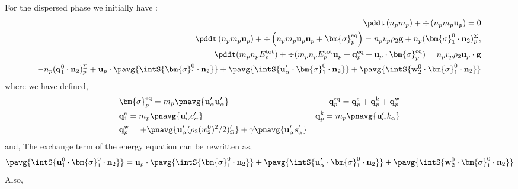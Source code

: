 For the dispersed phase we initially have :
\begin{align*}
    \pddt \left(n_p m_p\right)
    + \div \left(n_pm_p\textbf{u}_p
    \right)
    = 
    0\\
    \pddt \left(n_p m_p \textbf{u}_p\right)
    + \div \left(n_p
    m_p \textbf{u}_p \textbf{u}_p 
    + \bm{\sigma}_p^\text{eq}
    \right)
    = 
    n_p v_p \rho_2 \textbf{g}
    + n_p (\bm{\sigma}_1^0 \cdot \textbf{n}_2)_p^\Sigma,\\
    \pddt(m_p n_pE_p^\text{tot})
    + \div(m_pn_p E_p^\text{tot} \textbf{u}_p 
    + \textbf{q}_p^\text{eq} 
    + \textbf{u}_p \cdot \bm{\sigma}_p^\text{eq})
    =  n_p v_p \rho_2 \textbf{u}_p\cdot  \textbf{g}\\
    -  n_p (\textbf{q}_1^0 \cdot \textbf{n}_2)_p^\Sigma
    + \textbf{u}_p \cdot\pavg{\intS{\bm{\sigma}_1^0 \cdot \textbf{n}_2}}
    + \pavg{\intS{\textbf{u}_\alpha' \cdot\bm{\sigma}_1^0 \cdot \textbf{n}_2}}
    + \pavg{\intS{\textbf{w}_2^0 \cdot\bm{\sigma}_1^0 \cdot \textbf{n}_2}}
\end{align*}
where we have defined, 
\begin{align*}
    &\bm{\sigma}_p^\text{eq}
    =  m_p\pnavg{\textbf{u}_\alpha'\textbf{u}_\alpha'}
    &\textbf{q}_p^\text{eq}
    =\textbf{q}_p^\text{e} 
    +\textbf{q}_p^\text{k}  
    +\textbf{q}_p^\text{w}  
    \\
    &\textbf{q}_1^\text{e}
    = m_p \pnavg{\textbf{u}_\alpha' e_\alpha'} 
    &\textbf{q}_p^\text{k}
    = m_p \pnavg{\textbf{u}_\alpha' k_\alpha} 
    \\
    &\textbf{q}_p^\text{w}
    = 
    + \pnavg{\textbf{u}_\alpha'(\rho_2 (w^0_2)^2/2 )'_\Omega}
    + \gamma \pnavg{\textbf{u}_\alpha' s_\alpha'}
\end{align*}
and, 
The exchange term of the energy equation can be rewritten as, 
\begin{equation*}
    \pavg{\intS{\textbf{u}_1^0\cdot\bm{\sigma}_1^0 \cdot \textbf{n}_2}}
    = 
    \textbf{u}_p \cdot\pavg{\intS{\bm{\sigma}_1^0 \cdot \textbf{n}_2}}
    + \pavg{\intS{\textbf{u}_\alpha' \cdot\bm{\sigma}_1^0 \cdot \textbf{n}_2}}
    + \pavg{\intS{\textbf{w}_2^0 \cdot\bm{\sigma}_1^0 \cdot \textbf{n}_2}}
\end{equation*}
Also, 
